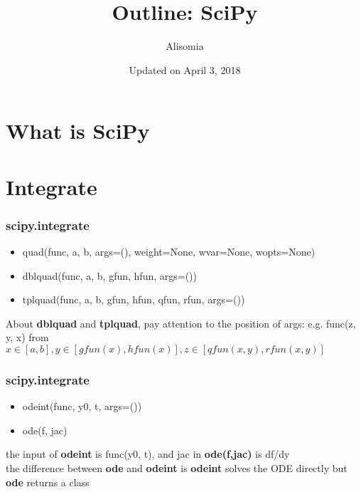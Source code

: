 \documentclass[english, nochinese]{beamer}
\title{Outline: SciPy}
\author{Alisomia}
\date{Updated on April 3, 2018}
\begin{document}
\begin{frame}
\titlepage
\end{frame}


\begin{frame}
\tableofcontents
\end{frame}


\section{What is SciPy}


\begin{frame}

\end{frame}


\section{Integrate}


\begin{frame}
\frametitle{scipy.integrate}

\begin{itemize}

\item quad(func, a, b, args=(), weight=None, wvar=None, wopts=None)
\item  dblquad(func, a, b, gfun, hfun, args=()) 
\item tplquad(func, a, b, gfun, hfun, qfun, rfun, args=())

\end{itemize}
About \textbf{dblquad} and \textbf{tplquad}, pay  attention to the position of args: e.g. func(z, y, x) from $x \in [a,b], y \in [gfun(x), hfun(x)], z \in [qfun(x, y), rfun(x, y)] $
\end{frame}

\begin{frame}
\frametitle{scipy.integrate}
\begin{itemize}
\item odeint(func, y0, t, args=())
\item ode(f, jac)
\end{itemize}
the input of \textbf{odeint} is func(y0, t), and jac in \textbf{ode(f,jac)} is df/dy\\
the difference between \textbf{ode} and \textbf{odeint} is \textbf{odeint} solves the ODE directly but \textbf{ode} returns a class
\end{frame}
\end{document}

